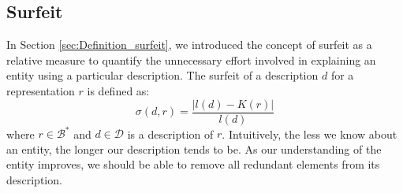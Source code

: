 
\subsection{Surfeit}

In Section \ref{sec:Definition_surfeit}, we introduced the concept of surfeit as a relative measure to quantify the unnecessary effort involved in explaining an entity using a particular description. The surfeit of a description $d$ for a representation $r$ is defined as:
\[
\sigma (d, r) = \frac{ | l(d) - K(r) |}{l(d)}
\]
where $r \in \mathcal{B}^\ast$ and $d \in \mathcal{D}$ is a description of $r$. Intuitively, the less we know about an entity, the longer our description tends to be. As our understanding of the entity improves, we should be able to remove all redundant elements from its description.

